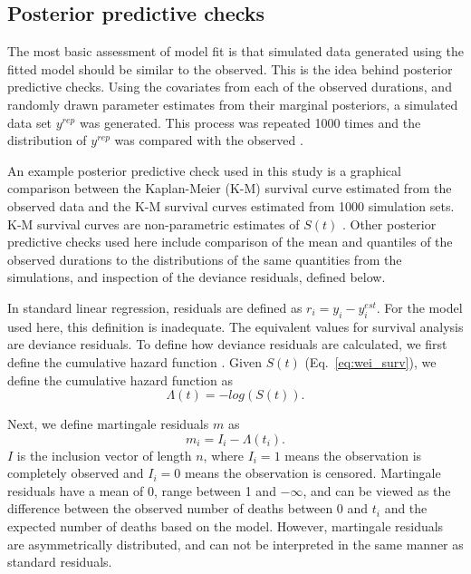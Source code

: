 \documentclass{article}
\begin{document}
\subsection{Posterior predictive checks}

The most basic assessment of model fit is that simulated data generated using the fitted model should be similar to the observed. This is the idea behind posterior predictive checks. Using the covariates from each of the observed durations, and randomly drawn parameter estimates from their marginal posteriors, a simulated data set \(y^{rep}\) was generated. This process was repeated 1000 times and the distribution of \(y^{rep}\) was compared with the observed \cite{Gelman2013d}.

An example posterior predictive check used in this study is a graphical comparison between the Kaplan-Meier (K-M) survival curve estimated from the observed data and the K-M survival curves estimated from 1000 simulation sets. K-M survival curves are non-parametric estimates of \(S(t)\) \cite{Klein2003}. Other posterior predictive checks used here include comparison of the mean and quantiles of the observed durations to the distributions of the same quantities from the simulations, and inspection of the deviance residuals, defined below.

In standard linear regression, residuals are defined as \(r_{i} = y_{i} - y_{i}^{est}\). For the model used here, this definition is inadequate. The equivalent values for survival analysis are deviance residuals. To define how deviance residuals are calculated, we first define the cumulative hazard function \cite{Klein2003}. Given \(S(t)\) (Eq.~\ref{eq:wei_surv}), we define the cumulative hazard function as 
\begin{equation*}
  \Lambda(t) = -log\left(S\left(t\right)\right).
\end{equation*}

Next, we define martingale residuals \(m\) as
\begin{equation*}
  m_{i} = I_{i} - \Lambda(t_i).
\end{equation*}
\(I\) is the inclusion vector of length \(n\), where \(I_{i} = 1\) means the observation is completely observed and \(I_{i} = 0\) means the observation is censored. Martingale residuals have a mean of 0, range between 1 and \(-\infty\), and can be viewed as the difference between the observed number of deaths between 0 and \(t_{i}\) and the expected number of deaths based on the model. However, martingale residuals are asymmetrically distributed, and can not be interpreted in the same manner as standard residuals. 
\end{document}
